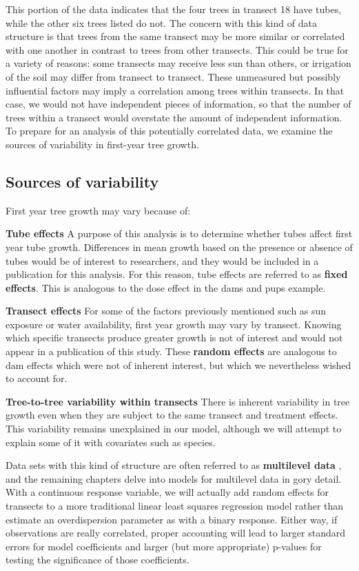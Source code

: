 \documentclass[
]{krantz}
\begin{document}
This portion of the data indicates that the four trees in transect 18 have tubes, while the other six trees listed do not. The concern with this kind of data structure is that trees from the same transect may be more similar or correlated with one another in contrast to trees from other transects. This could be true for a variety of reasons: some transects may receive less sun than others, or irrigation of the soil may differ from transect to transect. These unmeasured but possibly influential factors may imply a correlation among trees within transects. In that case, we would not have independent pieces of information, so that the number of trees within a transect would overstate the amount of independent information. To prepare for an analysis of this potentially correlated data, we examine the sources of variability in first-year tree growth.

\hypertarget{sources-of-variability-1}{%
\subsection{Sources of variability}\label{sources-of-variability-1}}

First year tree growth may vary because of:

\textbf{Tube effects} A purpose of this analysis is to determine whether tubes affect first year tube growth. Differences in mean growth based on the presence or absence of tubes would be of interest to researchers, and they would be included in a publication for this analysis. For this reason, tube effects are referred to as \textbf{fixed effects}. This is analogous to the dose effect in the dams and pups example.

\textbf{Transect effects} For some of the factors previously mentioned such as sun exposure or water availability, first year growth may vary by transect. Knowing which specific transects produce greater growth is not of interest and would not appear in a publication of this study. These \textbf{random effects} are analogous to dam effects which were not of inherent interest, but which we nevertheless wished to account for.

\textbf{Tree-to-tree variability within transects} There is inherent variability in tree growth even when they are subject to the same transect and treatment effects. This variability remains unexplained in our model, although we will attempt to explain some of it with covariates such as species.

Data sets with this kind of structure are often referred to as \textbf{multilevel data} , and the remaining chapters delve into models for multilevel data in gory detail. With a continuous response variable, we will actually add random effects for transects to a more traditional linear least squares regression model rather than estimate an overdispersion parameter as with a binary response. Either way, if observations are really correlated, proper accounting will lead to larger standard errors for model coefficients and larger (but more appropriate) p-values for testing the significance of those coefficients.
\end{document}
